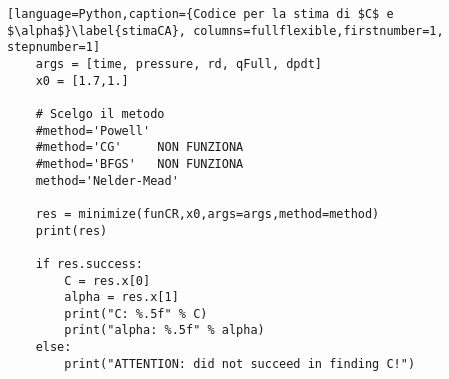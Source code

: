 \begin{lstlisting}[language=Python,caption={Codice per la stima di $C$ e $\alpha$}\label{stimaCA}, columns=fullflexible,firstnumber=1, stepnumber=1]
    args = [time, pressure, rd, qFull, dpdt]
    x0 = [1.7,1.]
    
    # Scelgo il metodo
    #method='Powell'
    #method='CG'     NON FUNZIONA
    #method='BFGS'   NON FUNZIONA
    method='Nelder-Mead'
    
    res = minimize(funCR,x0,args=args,method=method)
    print(res)
    
    if res.success:
        C = res.x[0]
        alpha = res.x[1]
        print("C: %.5f" % C)
        print("alpha: %.5f" % alpha)
    else:
        print("ATTENTION: did not succeed in finding C!")
\end{lstlisting}
